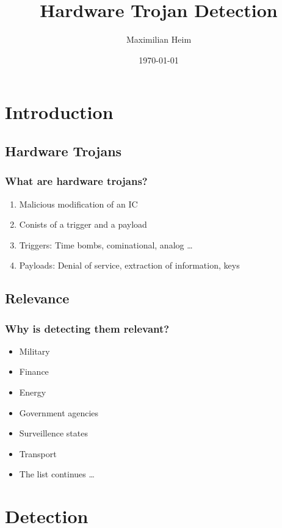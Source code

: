 \documentclass[11pt]{beamer}
\author{Maximilian Heim}
\title{Hardware Trojan Detection}
\institute{University Albstadt-Sigmaringen}
\date{\today}
\begin{document}
\begin{frame}
\titlepage
\end{frame}

\begin{frame}
\tableofcontents
\end{frame}

\section{Introduction}
\subsection{Hardware Trojans}
\begin{frame}
    \frametitle{What are hardware trojans?}
    \begin{enumerate}
    \item Malicious modification of an IC
    \item Conists of a trigger and a payload
    \item Triggers: Time bombs, cominational, analog \dots
    \item Payloads: Denial of service, extraction of information, keys
    \end{enumerate}
\end{frame}
\subsection{Relevance}
\begin{frame}
    \frametitle{Why is detecting them relevant?}
    \begin{itemize}
    \item Military
    \item Finance
    \item Energy
    \item Government agencies
    \item Surveillence states
    \item Transport
    \item The list continues \ldots
    \end{itemize}

\end{frame}


\section{Detection}
\end{document}
